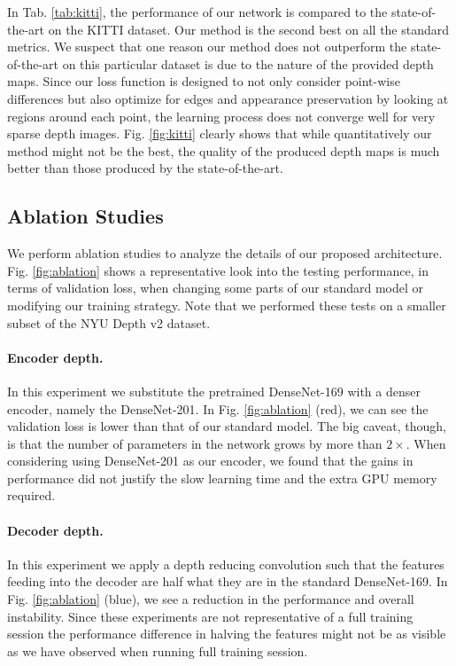 \documentclass[10pt,twocolumn,letterpaper]{article}
\begin{document}
In Tab. \ref{tab:kitti}, the performance of our network is compared to the state-of-the-art on the KITTI dataset. Our method is the second best on all the standard metrics. We suspect that one reason our method does not outperform the state-of-the-art on this particular dataset is due to the nature of the provided depth maps. Since our loss function is designed to not only consider point-wise differences but also optimize for edges and appearance preservation by looking at regions around each point, the learning process does not converge well for very sparse depth images. Fig. \ref{fig:kitti} clearly shows that while quantitatively our method might not be the best, the quality of the produced depth maps is much better than those produced by the state-of-the-art.    




\subsection{Ablation Studies}

We perform ablation studies to analyze the details of our proposed architecture. Fig. \ref{fig:ablation} shows a representative look into the testing performance, in terms of validation loss, when changing some parts of our standard model or modifying our training strategy. Note that we performed these tests on a smaller subset of the NYU Depth v2 dataset.

\paragraph{Encoder depth.} In this experiment we substitute the pretrained DenseNet-169 with a denser encoder, namely the DenseNet-201. In Fig. \ref{fig:ablation} (red), we can see the validation loss is lower than that of our standard model. The big caveat, though, is that the number of parameters in the network grows by more than $2\times$. When considering using DenseNet-201 as our encoder, we found that the gains in performance did not justify the slow learning time and the extra GPU memory required.

\paragraph{Decoder depth.} In this experiment we apply a depth reducing convolution such that the features feeding into the decoder are half what they are in the standard DenseNet-169. In Fig. \ref{fig:ablation} (blue), we see a reduction in the performance and overall instability. Since these experiments are not representative of a full training session the performance difference in halving the features might not be as visible as we have observed when running full training session.
\end{document}

